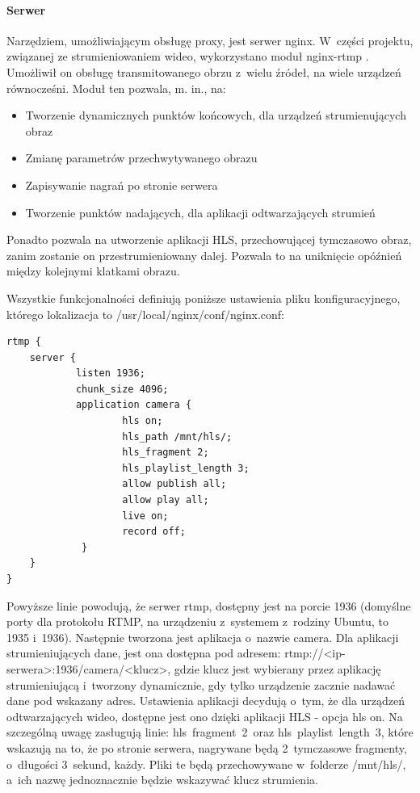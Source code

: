 \paragraph{Serwer}
Narzędziem, umożliwiającym obsługę proxy, jest serwer nginx. W~części projektu, związanej ze strumieniowaniem wideo, wykorzystano moduł nginx-rtmp \cite{NGINX}. Umożliwił on obsługę transmitowanego obrzu z~wielu źródeł, na wiele urządzeń równocześni. 
Moduł ten pozwala, m. in., na:
\begin{itemize}
\item Tworzenie dynamicznych punktów końcowych, dla urządzeń strumienujących obraz
\item Zmianę parametrów przechwytywanego obrazu 
\item Zapisywanie nagrań po stronie serwera
\item Tworzenie punktów nadających, dla aplikacji odtwarzających strumień
\end{itemize}
Ponadto pozwala na utworzenie aplikacji HLS, przechowującej tymczasowo obraz, zanim zostanie on przestrumieniowany dalej. Pozwala to na uniknięcie opóźnień między kolejnymi klatkami obrazu.

Wszystkie funkcjonalności definiują poniższe ustawienia pliku konfiguracyjnego, którego lokalizacja to /usr/local/nginx/conf/nginx.conf:

\begin{verbatim}
rtmp {
    server {
            listen 1936;
            chunk_size 4096;
            application camera {
                    hls on;
                    hls_path /mnt/hls/;
                    hls_fragment 2;
                    hls_playlist_length 3;
                    allow publish all;
                    allow play all;
                    live on;
                    record off;
             }
    }
}
\end{verbatim}

Powyższe linie powodują, że serwer rtmp, dostępny jest na porcie 1936 (domyślne porty dla protokołu RTMP, na urządzeniu z~systemem z~rodziny Ubuntu,  to 1935 i~1936). Następnie tworzona jest aplikacja o~nazwie camera. Dla aplikacji strumieniujących dane, jest ona dostępna pod adresem: rtmp://<ip-serwera>:1936/camera/<klucz>, gdzie klucz jest wybierany przez aplikację strumieniującą i~tworzony dynamicznie, gdy tylko urządzenie zacznie nadawać dane pod wskazany adres.
Ustawienia aplikacji decydują o~tym, że dla urządzeń odtwarzających wideo, dostępne jest ono dzięki aplikacji HLS - opcja hls on. Na szczególną uwagę zasługują linie: hls~fragment~2~oraz hls~playlist~length~3, które wskazują na to, że po stronie serwera, nagrywane będą 2~tymczasowe fragmenty, o~długości 3~sekund, każdy. Pliki te będą przechowywane w~folderze /mnt/hls/, a~ich nazwę jednoznacznie będzie wskazywać klucz strumienia.

